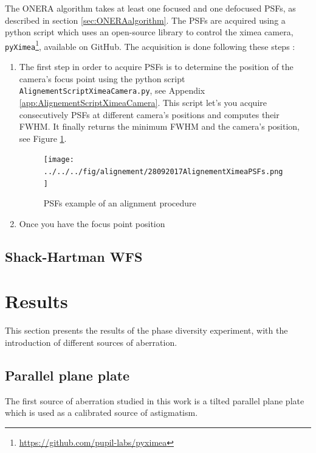 The ONERA algorithm takes at least one focused and one defocused PSFs, as described in section \ref{sec:ONERAalgorithm}. The PSFs are acquired using a python script which uses an open-source library to control the ximea camera, \verb|pyXimea|\footnote{\url{https://github.com/pupil-labs/pyximea}}, available on GitHub. The acquisition is done following these steps : 

\begin{enumerate}

\item The first step in order to acquire PSFs is to determine the position of the camera's focus point using the python script \verb|AlignementScriptXimeaCamera.py|, see Appendix \ref{app:AlignementScriptXimeaCamera}. This script let's you acquire consecutively PSFs at different camera's positions and computes their FWHM. It finally returns the minimum FWHM and the camera's position, see Figure \ref{fig:28092017AlignementXimeaPSFs}.

\begin{center}
\begin{figure}
\texttt{[image: ../../../fig/alignement/28092017AlignementXimeaPSFs.png]}
\decoRule
\caption{PSFs example of an alignment procedure}
\label{fig:28092017AlignementXimeaPSFs}
\end{figure}
\end{center}

\item Once you have the focus point position 

\end{enumerate}

\subsection{Shack-Hartman WFS}
\label{subsec:acquisSHwfs}


\section{Results}
\label{sec:Results}

This section presents the results of the phase diversity experiment, with the introduction of different sources of aberration.

\subsection{Parallel plane plate}
\label{subsec:ParPlanePlate}

The first source of aberration studied in this work is a tilted parallel plane plate which is used as a calibrated source of astigmatism.

